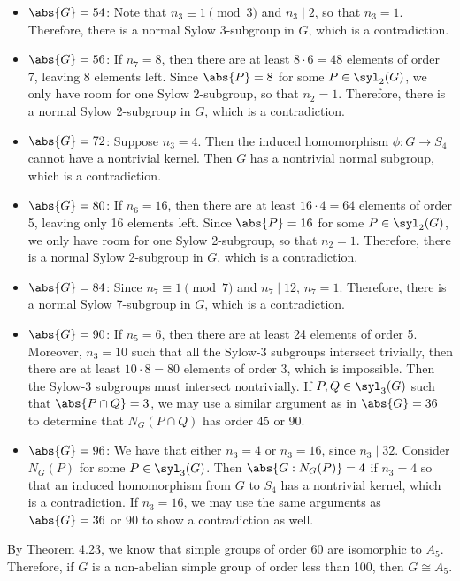 \begin{sol}
\begin{itemize}
	It follows that $\abs{N_G(P \cap Q)} = 48$ so that $P \cap Q \nsub G$, which is a contradiction.
		\item $\abs{G} = 54$: Note that $n_3 \equiv 1 \pmod 3$ and $n_3 \mid 2$, so that $n_3 = 1$.
	Therefore, there is a normal Sylow 3-subgroup in $G$, which is a contradiction.
		\item $\abs{G} = 56$: If $n_7 = 8$, then there are at least $8 \cdot 6 = 48$ elements of order 7, leaving 8 elements left.
	Since $\abs{P} = 8$ for some $P \in \syl_2(G)$, we only have room for one Sylow 2-subgroup, so that $n_2 = 1$.
	Therefore, there is a normal Sylow 2-subgroup in $G$, which is a contradiction.
		\item $\abs{G} = 72$: Suppose $n_3 = 4$.
	Then the induced homomorphism $\phi \colon G \to S_4$ cannot have a nontrivial kernel.
	Then $G$ has a nontrivial normal subgroup, which is a contradiction.
		\item $\abs{G} = 80$: If $n_6 = 16$, then there are at least $16 \cdot 4 = 64$ elements of order 5, leaving only 16 elements left.
	Since $\abs{P} = 16$ for some $P \in \syl_2(G)$, we only have room for one Sylow 2-subgroup, so that $n_2 = 1$.
	Therefore, there is a normal Sylow 2-subgroup in $G$, which is a contradiction.
		\item $\abs{G} = 84$: Since $n_7 \equiv 1 \pmod 7$ and $n_7 \mid 12$, $n_7 = 1$.
	Therefore, there is a normal Sylow 7-subgroup in $G$, which is a contradiction.
		\item $\abs{G} = 90$: If $n_5 = 6$, then there are at least 24 elements of order 5.
	Moreover, $n_3 = 10$ such that all the Sylow-3 subgroups intersect trivially, then there are at least $10 \cdot 8 = 80$ elements of order 3, which is impossible.
	Then the Sylow-3 subgroups must intersect nontrivially.
	If $P, Q \in \syl_3(G)$ such that $\abs{P \cap Q} = 3$, we may use a similar argument as in $\abs{G} = 36$ to determine that $N_G(P \cap Q)$ has order 45 or 90.
		\item $\abs{G} = 96$: We have that either $n_3 = 4$ or $n_3 = 16$, since $n_3 \mid 32$.
	Consider $N_G(P)$ for some $P \in \syl_3(G)$.
	Then $\abs{G : N_G(P)} = 4$ if $n_3 = 4$ so that an induced homomorphism from $G$ to $S_4$ has a nontrivial kernel, which is a contradiction.
	If $n_3 = 16$, we may use the same arguments as $\abs{G} = 36$ or 90 to show a contradiction as well.
	\end{itemize}
	By Theorem 4.23, we know that simple groups of order 60 are isomorphic to $A_5$.
	Therefore, if $G$ is a non-abelian simple group of order less than 100, then $G \cong A_5$.
\end{sol}

